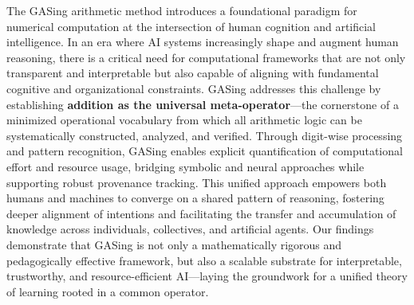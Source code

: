 The GASing arithmetic method introduces a foundational paradigm for numerical computation at the intersection of human cognition and artificial intelligence. In an era where AI systems increasingly shape and augment human reasoning, there is a critical need for computational frameworks that are not only transparent and interpretable but also capable of aligning with fundamental cognitive and organizational constraints. GASing addresses this challenge by establishing \textbf{addition as the universal meta-operator}—the cornerstone of a minimized operational vocabulary from which all arithmetic logic can be systematically constructed, analyzed, and verified. Through digit-wise processing and pattern recognition, GASing enables explicit quantification of computational effort and resource usage, bridging symbolic and neural approaches while supporting robust provenance tracking. This unified approach empowers both humans and machines to converge on a shared pattern of reasoning, fostering deeper alignment of intentions and facilitating the transfer and accumulation of knowledge across individuals, collectives, and artificial agents. Our findings demonstrate that GASing is not only a mathematically rigorous and pedagogically effective framework, but also a scalable substrate for interpretable, trustworthy, and resource-efficient AI—laying the groundwork for a unified theory of learning rooted in a common operator.

